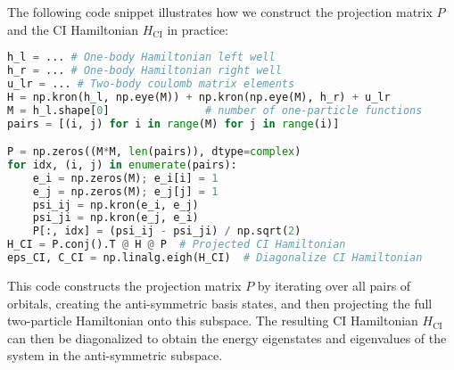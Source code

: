 \documentclass{subfiles}
\begin{document}
The following code snippet illustrates how we construct the projection matrix $P$ and the CI Hamiltonian $H_{\text{CI}}$ in practice:
\begin{lstlisting}[language=Python]
h_l = ... # One-body Hamiltonian left well
h_r = ... # One-body Hamiltonian right well
u_lr = ... # Two-body coulomb matrix elements
H = np.kron(h_l, np.eye(M)) + np.kron(np.eye(M), h_r) + u_lr 
M = h_l.shape[0]               # number of one-particle functions
pairs = [(i, j) for i in range(M) for j in range(i)]

P = np.zeros((M*M, len(pairs)), dtype=complex)
for idx, (i, j) in enumerate(pairs):
    e_i = np.zeros(M); e_i[i] = 1
    e_j = np.zeros(M); e_j[j] = 1
    psi_ij = np.kron(e_i, e_j)
    psi_ji = np.kron(e_j, e_i)
    P[:, idx] = (psi_ij - psi_ji) / np.sqrt(2)
H_CI = P.conj().T @ H @ P  # Projected CI Hamiltonian
eps_CI, C_CI = np.linalg.eigh(H_CI)  # Diagonalize CI Hamiltonian
\end{lstlisting}
This code constructs the projection matrix $P$ by iterating over all pairs of orbitals, creating the anti-symmetric basis states, and then projecting the full two-particle Hamiltonian onto this subspace. The resulting CI Hamiltonian $H_{\text{CI}}$ can then be diagonalized to obtain the energy eigenstates and eigenvalues of the system in the anti-symmetric subspace.
\end{document}
